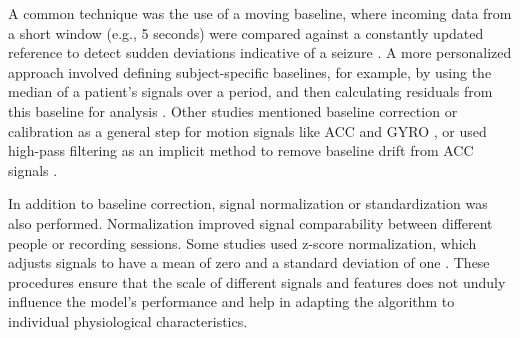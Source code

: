 A common technique was the use of a moving baseline, where incoming data from a short window (e.g., 5 seconds) were compared against a constantly updated reference to detect sudden deviations indicative of a seizure \cite{Cogan2017-lg}. A more personalized approach involved defining subject-specific baselines, for example, by using the median of a patient's signals over a period, and then calculating residuals from this baseline for analysis \cite{Jiang2022-zu}. Other studies mentioned baseline correction or calibration as a general step for motion signals like ACC and GYRO \cite{Ge2023-ab, Wang2025-ql}, or used high-pass filtering as an implicit method to remove baseline drift from ACC signals \cite{Milosevic2016-ee}.

In addition to baseline correction, signal normalization or standardization was also performed. Normalization improved signal comparability between different people or recording sessions. Some studies used z-score normalization, which adjusts signals to have a mean of zero and a standard deviation of one \cite{Nasseri2021-xn, Hegarty-Craver2021-hk}. These procedures ensure that the scale of different signals and features does not unduly influence the model's performance and help in adapting the algorithm to individual physiological characteristics.
